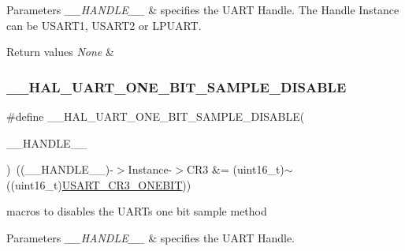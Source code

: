 \begin{DoxyParams}{Parameters}
{\em \+\_\+\+\_\+\+H\+A\+N\+D\+L\+E\+\_\+\+\_\+} & specifies the U\+A\+RT Handle. The Handle Instance can be U\+S\+A\+R\+T1, U\+S\+A\+R\+T2 or L\+P\+U\+A\+RT. \\
\hline
\end{DoxyParams}

\begin{DoxyRetVals}{Return values}
{\em None} & \\
\hline
\end{DoxyRetVals}
\mbox{\label{group___u_a_r_t___exported___macros_ga2dbd7e6592e8c5999f817b69f0fd24bb}} 
\subsubsection{\texorpdfstring{\+\_\+\+\_\+\+H\+A\+L\+\_\+\+U\+A\+R\+T\+\_\+\+O\+N\+E\+\_\+\+B\+I\+T\+\_\+\+S\+A\+M\+P\+L\+E\+\_\+\+D\+I\+S\+A\+B\+LE}{\_\_HAL\_UART\_ONE\_BIT\_SAMPLE\_DISABLE}}
{\footnotesize\ttfamily \#define \+\_\+\+\_\+\+H\+A\+L\+\_\+\+U\+A\+R\+T\+\_\+\+O\+N\+E\+\_\+\+B\+I\+T\+\_\+\+S\+A\+M\+P\+L\+E\+\_\+\+D\+I\+S\+A\+B\+LE(\begin{DoxyParamCaption}\item[{}]{\+\_\+\+\_\+\+H\+A\+N\+D\+L\+E\+\_\+\+\_\+ }\end{DoxyParamCaption})~((\+\_\+\+\_\+\+H\+A\+N\+D\+L\+E\+\_\+\+\_\+)-\/$>$Instance-\/$>$C\+R3 \&= (uint16\+\_\+t)$\sim$((uint16\+\_\+t)\mbox{\hyperlink{group___peripheral___registers___bits___definition_ga9a96fb1a7beab602cbc8cb0393593826}{U\+S\+A\+R\+T\+\_\+\+C\+R3\+\_\+\+O\+N\+E\+B\+IT}}))}



macros to disables the U\+A\+RT\textquotesingle{}s one bit sample method 


\begin{DoxyParams}{Parameters}
{\em \+\_\+\+\_\+\+H\+A\+N\+D\+L\+E\+\_\+\+\_\+} & specifies the U\+A\+RT Handle. ~\newline
\\
\hline
\end{DoxyParams}

